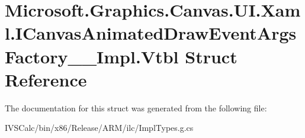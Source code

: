 \hypertarget{struct_microsoft_1_1_graphics_1_1_canvas_1_1_u_i_1_1_xaml_1_1_i_canvas_animated_draw_event_args_factory_____impl_1_1_vtbl}{}\section{Microsoft.\+Graphics.\+Canvas.\+U\+I.\+Xaml.\+I\+Canvas\+Animated\+Draw\+Event\+Args\+Factory\+\_\+\+\_\+\+Impl.\+Vtbl Struct Reference}
\label{struct_microsoft_1_1_graphics_1_1_canvas_1_1_u_i_1_1_xaml_1_1_i_canvas_animated_draw_event_args_factory_____impl_1_1_vtbl}


The documentation for this struct was generated from the following file\+:\begin{DoxyCompactItemize}
\item 
I\+V\+S\+Calc/bin/x86/\+Release/\+A\+R\+M/ilc/Impl\+Types.\+g.\+cs\end{DoxyCompactItemize}
